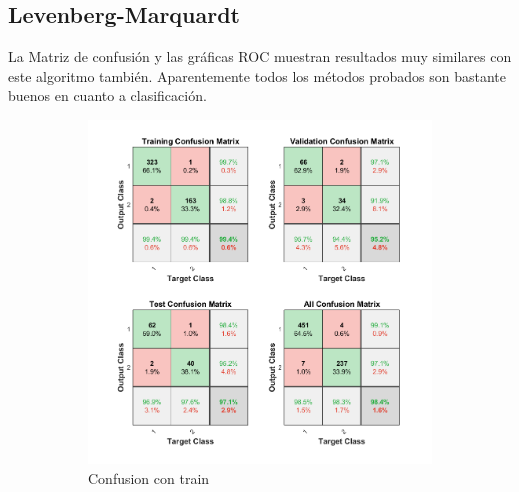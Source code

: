 \documentclass[a4paper, 12pt]{article}
\begin{document}
            \subsection{Levenberg-Marquardt}
                La Matriz de confusión y las gráficas ROC muestran resultados muy similares con este algoritmo también. Aparentemente todos los métodos probados son bastante buenos en cuanto a clasificación. 
                \begin{figure}[htp!]
                    \caption{Gráficas con Levenberg-Marquardt con división 70/15/15}
                    \begin{subfigure}{0.49\textwidth}
                        \centering
        		      \includegraphics[width=\textwidth]{figures/parte1/Ej4/ej4_confusion_trainlm.png}
                        \caption{Confusion con train}
                    \end{subfigure}
                    \begin{subfigure}{0.49\textwidth}

\end{subfigure}
\end{figure}
\end{document}
